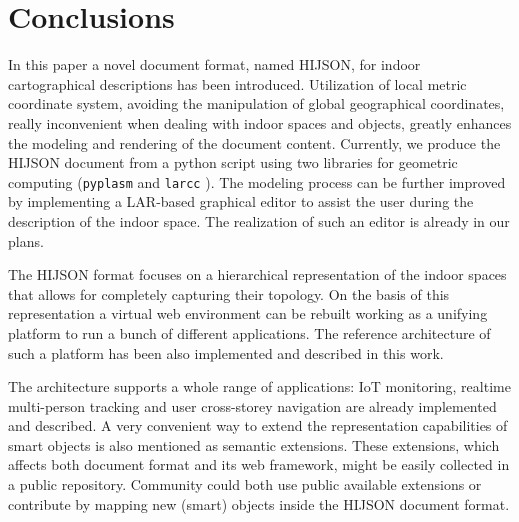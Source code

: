 \section{Conclusions}\label{conclusions}

In this paper a novel document format, named HIJSON, for indoor cartographical descriptions has been
introduced. Utilization of local metric coordinate system,
avoiding the manipulation of global geographical coordinates, really inconvenient when
dealing with indoor spaces and objects, greatly enhances the modeling and rendering
of the document content. Currently, we produce the HIJSON document from a python
script using two libraries for geometric computing (\texttt{pyplasm} and \texttt{larcc} \cite{Dicarlo:2014:TNL:2543138.2543294,paoluzziMS:2014,cadanda:2015}).
The modeling process can be further improved by implementing a LAR-based 
graphical editor to assist the user during the description of the indoor
space. The realization of such an editor is already in our plans.

The HIJSON format focuses on a hierarchical representation of the indoor
spaces that allows for completely capturing their topology. On the basis of
this representation a virtual web environment can be rebuilt working as a
unifying platform to run a bunch of different applications. The reference
architecture of such a platform has been also implemented and described in
this work. 

The architecture supports a whole range of applications: IoT monitoring,
realtime multi-person tracking and user cross-storey navigation are already
implemented and described. A very convenient way to extend the representation
capabilities of smart objects is also mentioned as semantic extensions. These
extensions, which affects both document format and its web framework, might be
easily collected in a public repository. Community could both use public
available extensions or contribute by mapping new (smart) objects inside the
HIJSON document format.
